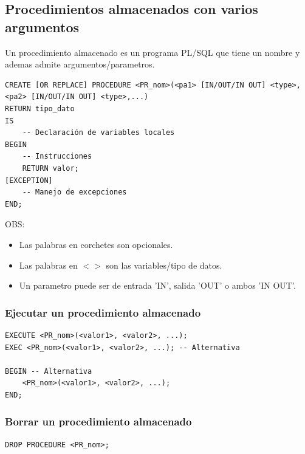 \documentclass{templateNote}
\begin{document}
\subsection{Procedimientos almacenados con varios argumentos}
Un procedimiento almacenado es un programa PL/SQL que tiene un nombre y ademas admite argumentos/parametros.

\begin{tcolorbox}[
    colframe=Morado!100, %
    colback=Morado!20,       %
    coltitle=white!100, %
    title=\textbf{PL/SQL}, %
]
    \begin{Verbatim}[breaklines=true]
CREATE [OR REPLACE] PROCEDURE <PR_nom>(<pa1> [IN/OUT/IN OUT] <type>, <pa2> [IN/OUT/IN OUT] <type>,...)
RETURN tipo_dato
IS
    -- Declaración de variables locales
BEGIN
    -- Instrucciones
    RETURN valor;
[EXCEPTION]
    -- Manejo de excepciones
END;
    \end{Verbatim}
\end{tcolorbox}
OBS:
\begin{itemize}
    \item Las palabras en corchetes son opcionales.
    \item Las palabras en $< >$ son las variables/tipo de datos.
    \item Un parametro puede ser de entrada 'IN', salida 'OUT' o ambos 'IN OUT'.
\end{itemize}
\subsubsection{Ejecutar un procedimiento almacenado}
\begin{tcolorbox}[
    colframe=Morado!100, %
    colback=Morado!20,       %
    coltitle=white!100, %
    title=\textbf{PL/SQL}, %
]
    \begin{Verbatim}[breaklines=true]
EXECUTE <PR_nom>(<valor1>, <valor2>, ...);
EXEC <PR_nom>(<valor1>, <valor2>, ...); -- Alternativa

BEGIN -- Alternativa
    <PR_nom>(<valor1>, <valor2>, ...);
END;
    \end{Verbatim}
\end{tcolorbox}

\subsubsection{Borrar un procedimiento almacenado}
\begin{tcolorbox}[
    colframe=red!90!black, %
    colback=red!20,       %
    coltitle=white!100, %
    title=\textbf{PL/SQL}, %
]
    \begin{Verbatim}[breaklines=true]
DROP PROCEDURE <PR_nom>;
    \end{Verbatim}
\end{tcolorbox}
\end{document}

